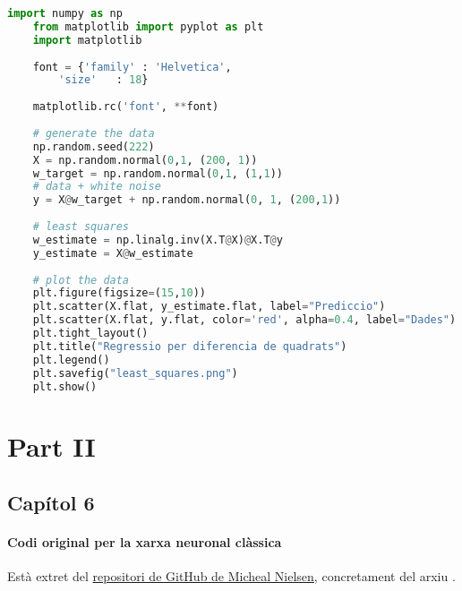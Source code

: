 \begin{lstlisting}[language=Python, caption=Regressió lineal]
	import numpy as np
	from matplotlib import pyplot as plt
	import matplotlib
	
	font = {'family' : 'Helvetica',
		'size'   : 18}
	
	matplotlib.rc('font', **font)
	
	# generate the data
	np.random.seed(222)
	X = np.random.normal(0,1, (200, 1))
	w_target = np.random.normal(0,1, (1,1))
	# data + white noise
	y = X@w_target + np.random.normal(0, 1, (200,1))
	
	# least squares
	w_estimate = np.linalg.inv(X.T@X)@X.T@y
	y_estimate = X@w_estimate
	
	# plot the data
	plt.figure(figsize=(15,10))
	plt.scatter(X.flat, y_estimate.flat, label="Prediccio")
	plt.scatter(X.flat, y.flat, color='red', alpha=0.4, label="Dades")
	plt.tight_layout()
	plt.title("Regressio per diferencia de quadrats")
	plt.legend()
	plt.savefig("least_squares.png")
	plt.show()
\end{lstlisting}

\section{Part II}
\subsection{Capítol 6}

\paragraph{Codi original per la xarxa neuronal clàssica}
\label{lst:disc_original}
Està extret del \href{https://github.com/mnielsen/neural-networks-and-deep-learning}{repositori de GitHub de Micheal Nielsen}, concretament del arxiu .


